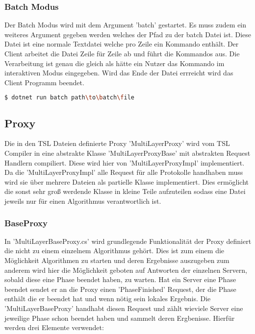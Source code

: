\subsubsection{Batch Modus}
 Der Batch Modus wird mit dem Argument 'batch' gestartet. Es muss zudem ein weiteres Argument gegeben werden welches der Pfad zu der batch Datei ist.
 Diese Datei ist eine normale Textdatei welche pro Zeile ein Kommando enthält. Der Client arbeitet die Datei Zeile für Zeile ab und führt die Kommandos aus.
 Die Verarbeitung ist genau die gleich als hätte ein Nutzer das Kommando im interaktiven Modus eingegeben. Wird das Ende der Datei errreicht wird das Client Programm beendet.

\begin{lstlisting}[language=bash]
  $ dotnet run batch path\to\batch\file 
\end{lstlisting}


\subsection{Proxy}



Die in den TSL Dateien definierte Proxy 'MultiLayerProxy' wird vom TSL Compiler in eine abstrakte Klasse 'MultiLayerProxyBase' mit abstrakten Request Handlern compiliert. Diese wird hier von 'MultiLayerProxyImpl' implementiert.
Da die 'MultiLayerProxyImpl' alle Request für alle Protokolle handhaben muss wird sie über mehrere Dateien als partielle Klasse implementiert. Dies ermöglicht die sonst sehr groß werdende Klasse in kleine Teile aufzuteilen sodass eine Datei jeweils nur für einen Algorithmus verantwortlich ist.

\subsubsection{BaseProxy}

In 'MultiLayerBaseProxy.cs' wird grundlegende Funktionalität der Proxy definiert die nicht zu einem einzelnem Algorithmus gehört. Dies ist zum einem die Möglichkeit Algorithmen zu starten und deren Ergebnisse auszugeben zum anderem wird hier die Möglichkeit geboten auf Antworten der einzelnen Servern, sobald diese eine Phase beendet haben, zu warten.
Hat ein Server eine Phase beendet sendet er an die Proxy einen 'PhaseFinished' Request, der die Phase enthält die er beendet hat und wenn nötig sein lokales Ergebnis. Die 'MultiLayerBaseProxy' handhabt diesen Request und zählt wieviele Server eine jeweilige Phase schon beendet haben und sammelt deren Ergbenisse. Hierfür werden drei Elemente verwendet:

